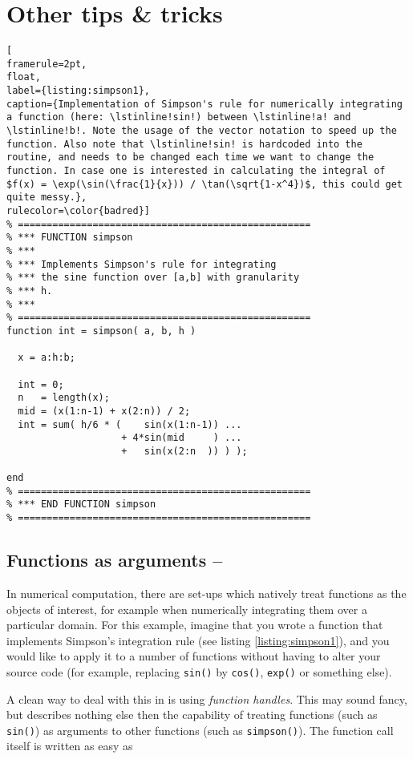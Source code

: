 \newpage
\section{Other tips \& tricks}

\begin{lstlisting}[
framerule=2pt,
float,
label={listing:simpson1},
caption={Implementation of Simpson's rule for numerically integrating a function (here: \lstinline!sin!) between \lstinline!a! and \lstinline!b!. Note the usage of the vector notation to speed up the function. Also note that \lstinline!sin! is hardcoded into the routine, and needs to be changed each time we want to change the function. In case one is interested in calculating the integral of $f(x) = \exp(\sin(\frac{1}{x})) / \tan(\sqrt{1-x^4})$, this could get quite messy.},
rulecolor=\color{badred}]
% ===================================================
% *** FUNCTION simpson
% ***
% *** Implements Simpson's rule for integrating
% *** the sine function over [a,b] with granularity
% *** h.
% ***
% ===================================================
function int = simpson( a, b, h )

  x = a:h:b;

  int = 0;
  n   = length(x);
  mid = (x(1:n-1) + x(2:n)) / 2;
  int = sum( h/6 * (    sin(x(1:n-1)) ...
                    + 4*sin(mid     ) ...
                    +   sin(x(2:n  )) ) );

end 
% ===================================================
% *** END FUNCTION simpson
% ===================================================
\end{lstlisting}

\subsection{Functions as arguments -- \cleansymbol\cleansymbol\cleansymbol}

In numerical computation, there are set-ups which natively treat functions as the objects of interest, for example when numerically integrating them over a particular domain. For this example, imagine that you wrote a function that implements Simpson's integration rule (see listing \ref{listing:simpson1}), and you would like to apply it to a number of functions without having to alter your source code (for example, replacing \lstinline!sin()! by \lstinline!cos()!, \lstinline!exp()! or something else).

A clean way to deal with this in \matlab{} is using \emph{function handles}. This may sound fancy, but describes nothing else then the capability of treating functions (such as \lstinline!sin()!) as arguments to other functions (such as \lstinline!simpson()!). The function call itself is written as easy as

